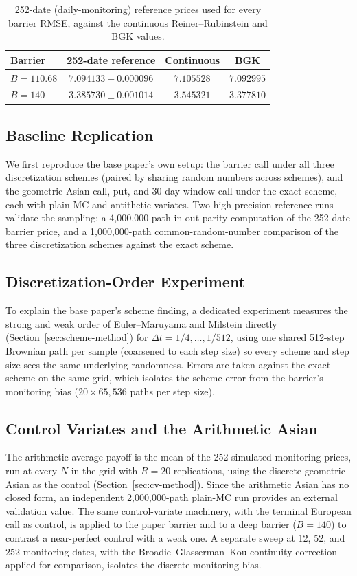 \documentclass[sigconf]{acmart}
\begin{document}
\begin{table}[t]
\caption{252-date (daily-monitoring) reference prices used for every barrier
RMSE, against the continuous Reiner--Rubinstein and BGK values.}
\label{tab:refs}
\small
\begin{tabular}{lccc}
\toprule
\textbf{Barrier} & \textbf{252-date reference} & \textbf{Continuous} & \textbf{BGK} \\
\midrule
$B=110.68$ & $7.094133\pm0.000096$ & $7.105528$ & $7.092995$ \\
$B=140$ & $3.385730\pm0.001014$ & $3.545321$ & $3.377810$ \\
\bottomrule
\end{tabular}
\end{table}

\subsection{Baseline Replication}
We first reproduce the base paper's own setup: the barrier call under all
three discretization schemes (paired by sharing random numbers across
schemes), and the geometric Asian call, put, and 30-day-window call under the
exact scheme, each with plain MC and antithetic variates. Two
high-precision reference runs validate the sampling: a 4{,}000{,}000-path
in-out-parity computation of the 252-date barrier price, and a
1{,}000{,}000-path common-random-number comparison of the three
discretization schemes against the exact scheme.

\subsection{Discretization-Order Experiment}
\label{sec:scheme-exp}
To explain the base paper's scheme finding, a dedicated experiment measures
the strong and weak order of Euler--Maruyama and Milstein directly (Section~\ref{sec:scheme-method}) for
$\Delta t=1/4,\ldots,1/512$, using one shared 512-step Brownian path per
sample (coarsened to each step size) so every scheme and step size sees the
same underlying randomness. Errors are taken against the exact scheme on the
same grid, which isolates the scheme error from the barrier's monitoring
bias ($20\times65{,}536$ paths per step size).

\subsection{Control Variates and the Arithmetic Asian}
The arithmetic-average payoff is the mean of the 252 simulated monitoring
prices, run at every $N$ in the grid with $R=20$ replications, using the
discrete geometric Asian as the control (Section~\ref{sec:cv-method}). Since
the arithmetic Asian has no closed form, an independent
2{,}000{,}000-path plain-MC run provides an external validation value. The
same control-variate machinery, with the terminal European call as control,
is applied to the paper barrier and to a deep barrier ($B=140$) to contrast a
near-perfect control with a weak one. A separate sweep at 12, 52, and 252
monitoring dates, with the Broadie--Glasserman--Kou continuity
correction~\cite{BroadieGlassermanKou1997} applied for comparison, isolates
the discrete-monitoring bias.
\end{document}
